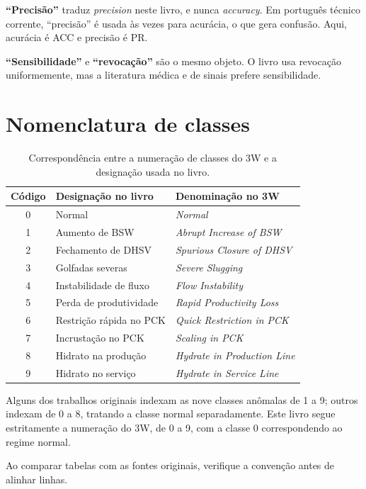 \begin{destaque}
\textbf{``Precisão''} traduz \emph{precision} neste livro, e nunca \emph{accuracy}. Em
português técnico corrente, ``precisão'' é usada às vezes para acurácia, o que gera
confusão. Aqui, acurácia é ACC e precisão é PR.

\textbf{``Sensibilidade''} e \textbf{``revocação''} são o mesmo objeto. O livro usa
revocação uniformemente, mas a literatura médica e de sinais prefere sensibilidade.
\end{destaque}

\section{Nomenclatura de classes}

\begin{table}[htbp]
\centering
\caption{Correspondência entre a numeração de classes do 3W e a designação usada no
livro.}
\label{tab:notb-classes}
\small
\begin{tabular}{clp{6.8cm}}
\toprule
\textbf{Código} & \textbf{Designação no livro} & \textbf{Denominação no 3W} \\
\midrule
0 & Normal & \emph{Normal} \\
1 & Aumento de BSW & \emph{Abrupt Increase of BSW} \\
2 & Fechamento de DHSV & \emph{Spurious Closure of DHSV} \\
3 & Golfadas severas & \emph{Severe Slugging} \\
4 & Instabilidade de fluxo & \emph{Flow Instability} \\
5 & Perda de produtividade & \emph{Rapid Productivity Loss} \\
6 & Restrição rápida no PCK & \emph{Quick Restriction in PCK} \\
7 & Incrustação no PCK & \emph{Scaling in PCK} \\
8 & Hidrato na produção & \emph{Hydrate in Production Line} \\
9 & Hidrato no serviço & \emph{Hydrate in Service Line} \\
\bottomrule
\end{tabular}
\end{table}

\begin{destaque}
Alguns dos trabalhos originais indexam as nove classes anômalas de 1 a 9; outros indexam
de 0 a 8, tratando a classe normal separadamente. Este livro segue estritamente a
numeração do 3W, de 0 a 9, com a classe 0 correspondendo ao regime normal.

Ao comparar tabelas com as fontes originais, verifique a convenção antes de alinhar
linhas.
\end{destaque}
